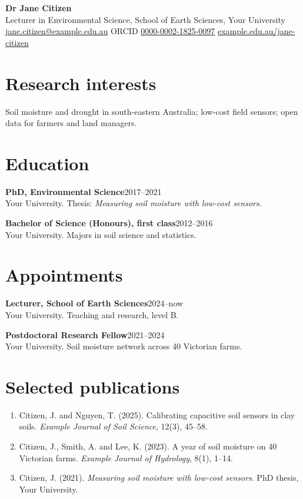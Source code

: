 \documentclass[10pt,a4paper]{article}   %
\newcommand{\entry}[3]{\textbf{#1}\hfill #2\\#3\par}
\begin{document}
{\LARGE\bfseries Dr Jane Citizen}\\[3pt]
Lecturer in Environmental Science, School of Earth Sciences, Your University\\
\href{mailto:jane.citizen@example.edu.au}{jane.citizen@example.edu.au} \quad
ORCID \href{https://orcid.org/0000-0002-1825-0097}{0000-0002-1825-0097} \quad
\href{https://example.edu.au/jane-citizen}{example.edu.au/jane-citizen}

\section{Research interests}
Soil moisture and drought in south-eastern Australia; low-cost field sensors; open data for
farmers and land managers.

\section{Education}
\entry{PhD, Environmental Science}{2017--2021}{Your University. Thesis: \emph{Measuring soil moisture with low-cost sensors}.}
\entry{Bachelor of Science (Honours), first class}{2012--2016}{Your University. Majors in soil science and statistics.}

\section{Appointments}
\entry{Lecturer, School of Earth Sciences}{2024--now}{Your University. Teaching and research, level B.}
\entry{Postdoctoral Research Fellow}{2021--2024}{Your University. Soil moisture network across 40 Victorian farms.}

\section{Selected publications}
\begin{enumerate}
  \item Citizen, J. and Nguyen, T. (2025). Calibrating capacitive soil sensors in clay soils.
        \emph{Example Journal of Soil Science}, 12(3), 45--58.
  \item Citizen, J., Smith, A. and Lee, K. (2023). A year of soil moisture on 40 Victorian farms.
        \emph{Example Journal of Hydrology}, 8(1), 1--14.
  \item Citizen, J. (2021). \emph{Measuring soil moisture with low-cost sensors}. PhD thesis,
        Your University.
\end{enumerate}
\end{document}
